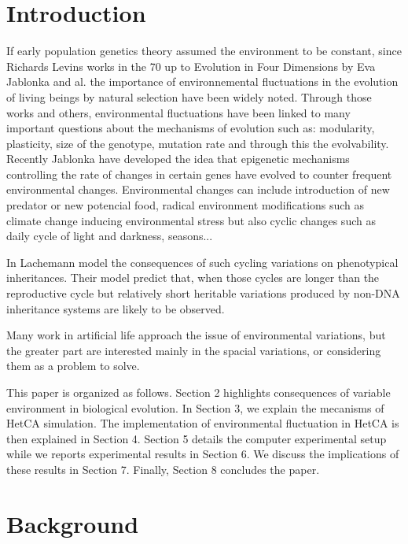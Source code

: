 \documentclass{sig-alternate-05-2015}
\begin{document}


\section{Introduction}
If early population genetics theory assumed the environment to be constant, since Richards Levins works \cite{levins1968evolution} in the 70 up to Evolution in Four Dimensions by Eva Jablonka and al. \cite{jablonka2014evolution} the importance of environnemental fluctuations in the evolution of living beings by natural selection have been widely noted. Through those works and others, environmental fluctuations have been linked to many important questions about the mechanisms of evolution such as: modularity, plasticity, size of the genotype, mutation rate and through this the evolvability. Recently Jablonka\cite{jablonka2014evolution} have developed the idea that epigenetic mechanisms controlling the rate of changes in certain genes have evolved to counter frequent environmental changes. 
Environmental changes can include introduction of new predator or new potencial food, radical environment modifications such as climate change inducing environmental stress but also cyclic changes such as daily cycle of light and darkness, seasons...  

In \cite{lachmann1996inheritance} Lachemann model the consequences of such cycling variations on phenotypical inheritances. Their model predict that, when those cycles are longer than the reproductive cycle but relatively short heritable variations produced by non-DNA inheritance systems are likely to be observed.

Many work in artificial life approach the issue of environmental variations, but the greater part are interested mainly in the spacial variations, or considering them as a problem to solve.

This paper is organized as follows. Section 2 highlights consequences of variable environment in biological evolution. In Section 3, we explain the mecanisms of HetCA simulation. The implementation of environmental fluctuation in HetCA  is then explained in Section 4. Section 5 details the computer experimental setup while we reports experimental results in Section 6. We discuss the implications of these results in Section 7. Finally, Section 8 concludes the paper.


\section{Background}
\end{document}
